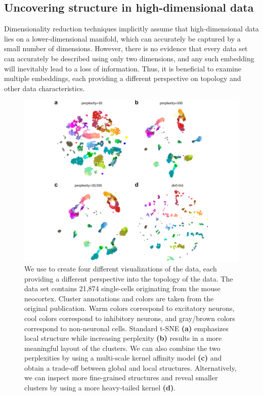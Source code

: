 \documentclass[article]{jss}
\newcommand{\opentsne}{\pkg{openTSNE}\xspace}
\begin{document}
\subsection{Uncovering structure in high-dimensional data}

Dimensionality reduction techniques implicitly assume that high-dimensional data lies on a lower-dimensional manifold, which can accurately be captured by a small number of dimensions. However, there is no evidence that every data set can accurately be described using only two dimensions, and any such embedding will inevitably lead to a loss of information. Thus, it is beneficial to examine multiple embeddings, each providing a different perspective on topology and other data characteristics.

\begin{figure}[htbp]
  \center
  \includegraphics[width=\textwidth]{tasic2018}
  \caption{\label{fig:tasic}
  We use \opentsne to create four different
  visualizations of the \citet{tasic2018shared} data,
  each providing a different perspective into the topology of the data.
  The data set contains 21,874 single-cells originating from the mouse
  neocortex. Cluster annotations and colors are taken from the original
  publication. Warm colors correspond to excitatory neurons, cool colors
  correspond to inhibitory neurons, and gray/brown colors correspond to
  non-neuronal cells. Standard t-SNE \textbf{(a)} emphasizes local
  structure while increasing perplexity \textbf{(b)} results in a more
  meaningful layout of the clusters. We can also combine the two
  perplexities by using a multi-scale kernel affinity model \textbf{(c)}
  and obtain a trade-off between global and local structures.
  Alternatively, we can inspect more fine-grained structures and reveal
  smaller clusters by using a more heavy-tailed kernel \textbf{(d)}.}
\end{figure}
\end{document}
